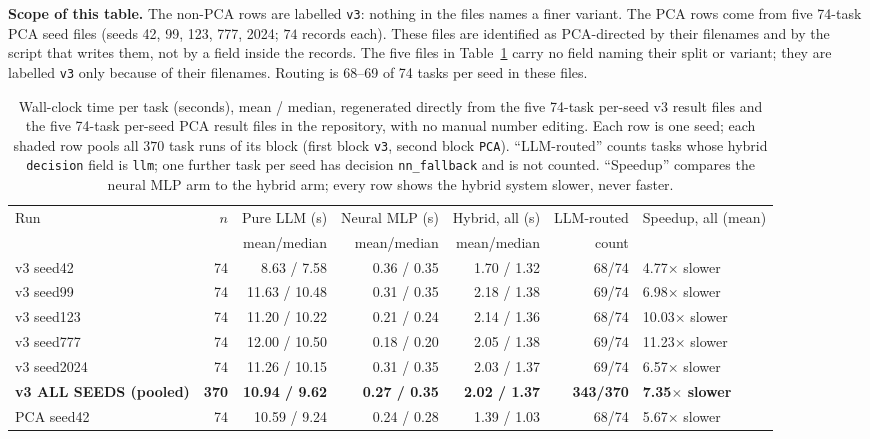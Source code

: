 \documentclass[twoside,11pt]{article}
\begin{document}
\textbf{Scope of this table.} The non-PCA rows are labelled \texttt{v3}: nothing in the
files names a finer variant. The PCA rows come from five 74-task PCA seed files
(seeds 42, 99, 123, 777, 2024;
$74$ records each). These files are
identified as PCA-directed by their filenames and by the script that writes them, not by a
field inside the records. The five files in Table~\ref{tab:timing_full} carry no field
naming their split or variant; they are labelled \texttt{v3} only because of their
filenames. Routing is 68--69 of 74 tasks per seed in these files.

\begin{table}[htbp]
\centering
\small
\caption{Wall-clock time per task (seconds), mean / median, regenerated
directly from the five 74-task per-seed v3 result files and the five 74-task
per-seed PCA result files in the repository,
with no manual number editing. Each row is one seed; each shaded row pools all $370$
task runs of its block (first block \texttt{v3}, second block \texttt{PCA}).
``LLM-routed'' counts tasks whose hybrid \texttt{decision} field is
\texttt{llm}; one further task per seed has decision \texttt{nn\_fallback} and
is not counted. ``Speedup'' compares the neural MLP arm to the hybrid arm;
every row shows the hybrid system slower, never faster.}
\label{tab:timing_full}
\begin{tabular}{lrrrrrl}
\toprule
Run & $n$ & Pure LLM (s) & Neural MLP (s) & Hybrid, all (s) & LLM-routed & Speedup, all (mean) \\
    &     & mean/median  & mean/median    & mean/median      & count      &  \\
\midrule
v3 seed42 & 74 & 8.63 / 7.58 & 0.36 / 0.35 & 1.70 / 1.32 & 68/74 & 4.77$\times$ slower \\
v3 seed99 & 74 & 11.63 / 10.48 & 0.31 / 0.35 & 2.18 / 1.38 & 69/74 & 6.98$\times$ slower \\
v3 seed123 & 74 & 11.20 / 10.22 & 0.21 / 0.24 & 2.14 / 1.36 & 68/74 & 10.03$\times$ slower \\
v3 seed777 & 74 & 12.00 / 10.50 & 0.18 / 0.20 & 2.05 / 1.38 & 69/74 & 11.23$\times$ slower \\
v3 seed2024 & 74 & 11.26 / 10.15 & 0.31 / 0.35 & 2.03 / 1.37 & 69/74 & 6.57$\times$ slower \\
\rowcolor{black!8}
\textbf{v3 ALL SEEDS (pooled)} & \textbf{370} & \textbf{10.94 / 9.62} & \textbf{0.27 / 0.35} & \textbf{2.02 / 1.37} & \textbf{343/370} & \textbf{7.35$\times$ slower} \\
PCA seed42 & 74 & 10.59 / 9.24 & 0.24 / 0.28 & 1.39 / 1.03 & 68/74 & 5.67$\times$ slower \\

\end{tabular}
\end{table}
\end{document}
